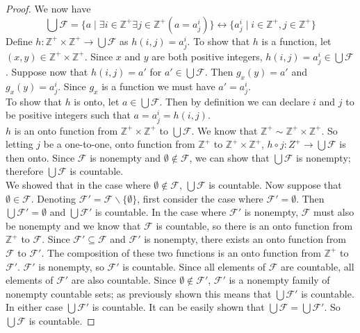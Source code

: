\documentclass{report}
\theoremstyle{definition}
\begin{document}
\begin{proof}
\indent We now have
\begin{equation*}
\bigcup\mathcal F=\{a\mid\exists i\in\mathbb Z^+\exists j\in\mathbb Z^+(a=a^i_j)
\}\leftrightarrow
\{a^i_j\mid i\in\mathbb Z^+,j\in\mathbb Z^+\}
\end{equation*}
Define $h:\mathbb Z^+\times\mathbb Z^+\to\bigcup\mathcal F$ as $h(i,j)=a^i_j$.
To show that $h$ is a function, let $(x,y)\in\mathbb Z^+\times\mathbb Z^+$. Since $x$ and $y$ are both positive integers, $h(i,j)=a^i_j\in\bigcup\mathcal F$.
Suppose now that $h(i,j)=a'$ for $a'\in\bigcup\mathcal F$. Then $g_x(y)=a'$ and $g_x(y)=a^i_j$.
Since $g_x$ is a function we must have $a'=a^i_j$.\\
\indent To show that $h$ is onto, let $a\in\bigcup\mathcal F$. Then by definition we can declare $i$ and $j$ to be positive integers such that $a=a^i_j=h(i,j)$.\\
\indent $h$ is an onto function from $\mathbb Z^+\times\mathbb Z^+$ to $\bigcup\mathcal F$. We know that $\mathbb Z^+\sim\mathbb Z^+\times\mathbb Z^+$. So letting $j$ be a one-to-one, onto 
function from $\mathbb Z^+$ to $\mathbb Z^+\times\mathbb Z^+$, $h\circ j:Z^+\to\bigcup\mathcal F$ is then onto. Since $\mathcal F$ is nonempty and $\emptyset\notin\mathcal F$, we can show that 
$\bigcup\mathcal F$ is nonempty; therefore $\bigcup\mathcal F$ is countable.\\
\indent We showed that in the case where $\emptyset\notin\mathcal F$, $\bigcup\mathcal F$ is countable. Now suppose that $\emptyset\in\mathcal F$. 
Denoting $\mathcal F'=\mathcal F\backslash\{\emptyset\}$, first consider the case where $\mathcal F'=\emptyset$. Then $\bigcup\mathcal F'=\emptyset$ and $\bigcup\mathcal F'$ is countable. 
In the case where $\mathcal F'$ is nonempty, $\mathcal F$ must also be nonempty and we know that $\mathcal F$ is countable, so there is an onto function from $\mathbb Z^+$ to $\mathcal F$. 
Since $\mathcal F'\subseteq\mathcal F$ and $\mathcal F'$ is nonempty, there exists an onto function from $\mathcal F$ to $\mathcal F'$. The composition of these two functions is an onto function
from $\mathbb Z^+$ to $\mathcal F'$. $\mathcal F'$ is nonempty, so $\mathcal F'$ is countable. 
Since all elements of $\mathcal F$ are countable, all elements of $\mathcal F'$ are also countable.
Since $\emptyset\notin\mathcal F'$, $\mathcal F'$ is a nonempty family of nonempty countable sets; as previously shown this means that $\bigcup\mathcal F'$ is countable.\\
\indent In either case $\bigcup\mathcal F'$ is countable. It can be easily shown that $\bigcup\mathcal F=\bigcup\mathcal F'$. 
So $\bigcup\mathcal F$ is countable.
\end{proof}
\newpage
\end{document}

